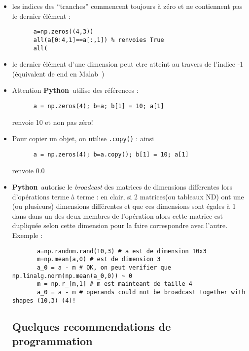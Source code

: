 \documentclass[11pt]{article}
\newcommand{\matlab}{{\ECFTeenSpirit Malab}\ }
\newcommand{\python}{{\bf Python}\ }
\begin{document}
    \begin{itemize}
      
      \item les indices des ``tranches'' commencent toujours à zéro et ne contiennent pas le dernier élément : 
      \begin{lstlisting} 
      a=np.zeros((4,3))
      all(a[0:4,1]==a[:,1]) % renvoies True
      all(
      \end{lstlisting}
      \item le dernier élément d'une dimension peut etre atteint au travers de l'indice -1 (équivalent de end en \matlab)
      \item Attention \python utilise des références : 
      \begin{lstlisting} 
      a = np.zeros(4); b=a; b[1] = 10; a[1]
      \end{lstlisting}
      renvoie 10 et non pas zéro!
      \item Pour copier un objet, on utilise {\tt .copy()} : ainsi 
      \begin{lstlisting} 
      a = np.zeros(4); b=a.copy(); b[1] = 10; a[1]
      \end{lstlisting}
      renvoie 0.0 
      
      \item \python autorise le {\em broadcast} des matrices de dimensions differentes lors d'opérations terme à terme : en clair,
      si 2 matrices(ou tableaux ND) ont une (ou plusieurs) dimensions différentes et que ces dimensions sont égales à 1 dans
      dans un des deux membres de l'opération alors cette matrice est dupliquée selon cette dimension pour la faire correspondre avec l'autre. 
      Exemple : 
      \begin{lstlisting} 
       a=np.random.rand(10,3) # a est de dimension 10x3
       m=np.mean(a,0) # est de dimension 3
       a_0 = a - m # OK, on peut verifier que np.linalg.norm(np.mean(a_0,0)) ~ 0
       m = np.r_[m,1] # m est mainteant de taille 4
       a_0 = a - m # operands could not be broadcast together with shapes (10,3) (4)!
      \end{lstlisting}

  \subsection{Quelques recommendations de programmation}
 
    \begin{itemize}


\end{itemize}
\end{itemize}
\end{document}

